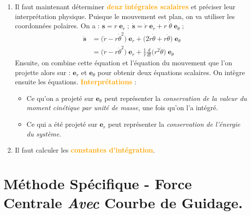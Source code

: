 \documentclass[a4paper]{article}
\begin{document}
\begin{enumerate}
\item Il faut maintenant déterminer \textcolor{orange}{\textbf{\emph{deux} intégrales scalaires}} et préciser leur interprétation physique. Puisque le mouvement est plan, on va utiliser les coordonnées polaires. On a : $ \textbf{s} = r \; \textbf{e}_r \; ; \; \dot{\textbf{s}} = \dot{r} \; \textbf{e}_r + r \; \dot{\theta} \; \textbf{e}_\theta \; ; $
\[ \begin{aligned}
\ddot{\textbf{s}} &= \big( \ddot{r} - r \dot{\theta}^2 \big) \; \textbf{e}_r + \big( 2 \dot{r} \dot{\theta} + r \ddot{\theta} \big) \; \textbf{e}_\theta \\
&= \big( \ddot{r} - r \dot{\theta}^2 \big) \; \textbf{e}_r + \frac{1}{r} \frac{d}{d t} \big( r^2 \dot{\theta} \big) \; \textbf{e}_\theta
\end{aligned} \]
Ensuite, on combine cette équation et l'équation du mouvement que l'on projette alors sur : $ \textbf{e}_r $ et $ \textbf{e}_\theta $ pour obtenir deux équations scalaires. On intègre ensuite les équations. \textcolor{orange}{\textbf{Interprétations}} :
\begin{itemize}
    \item Ce qu'on a projeté sur $ \textbf{e}_\theta $ peut représenter la \emph{conservation de la valeur du moment cinétique par unité de masse}, une fois qu'on l'a intégré.
    \item Ce qui a été projeté sur $ \textbf{e}_r $ peut représenter la \emph{conservation de l’énergie du système}.
\end{itemize}





\item Il faut calculer les \textcolor{orange}{\textbf{constantes d'intégration}}.

\end{enumerate}










\section{Méthode Spécifique - Force Centrale \emph{Avec} Courbe de Guidage.}
\end{document}
